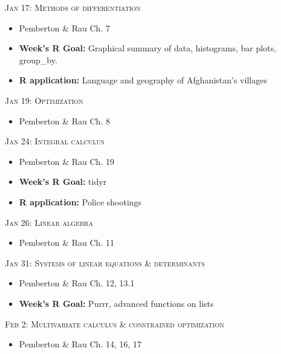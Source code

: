 \documentclass[11pt]{article}
\begin{document}
\noindent \textsc{Jan 17: Methods of differentiation}

\begin{itemize}

\item Pemberton \& Rau Ch. 7
\item  {\bf Week's R Goal:} Graphical summary of data, histograms, bar plots, group\_by.
\item {\bf R application: } Language and geography of Afghanistan's villages
\end{itemize}

\noindent \textsc{Jan 19: Optimization}

\begin{itemize}

\item Pemberton \& Rau Ch. 8

\end{itemize}

\noindent \textsc{Jan 24: Integral calculus }

\begin{itemize}

\item Pemberton \& Rau Ch. 19
\item  {\bf Week's R Goal:}  tidyr
\item {\bf R application: } Police shootings
\end{itemize}


\noindent \textsc{Jan 26: Linear algebra }

\begin{itemize}
\item Pemberton \& Rau Ch. 11


\end{itemize}


\noindent \textsc{Jan 31: Systems of linear equations \& determinants }

\begin{itemize}
\item Pemberton \& Rau Ch. 12, 13.1
\item  {\bf Week's R Goal:} Purrr, advanced functions on lists

\end{itemize}


\noindent \textsc{Feb 2:  Multivariate calculus \& constrained optimization}

\begin{itemize}

\item Pemberton \& Rau Ch. 14, 16, 17


\end{itemize}
\end{document}

